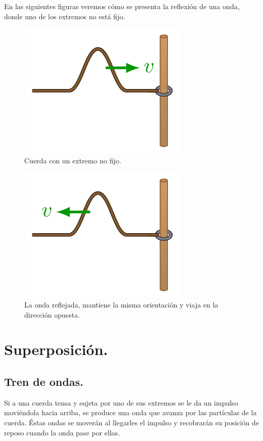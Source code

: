 \documentclass[12pt, letter]{article}
\begin{document}
En las siguientes figuras veremos cómo se presenta la reflexión de una onda, donde uno de los extremos no está fijo.
\begin{figure}[H]
    \centering
    \includegraphics[scale=0.7]{Imagenes/Reflexion_Ondas_03.png}
    \caption{Cuerda con un extremo no fijo.}
\end{figure}
\begin{figure}[H]
    \centering
    \includegraphics[scale=0.7]{Imagenes/Reflexion_Ondas_04.png}
    \caption{La onda reflejada, mantiene la misma orientación y viaja en la dirección opuesta.}
\end{figure}


\section{Superposición.}

\subsection{Tren de ondas.}

Si a una cuerda tensa y sujeta por uno de sus extremos se le da un impulso moviéndola hacia arriba, se produce una onda que avanza por las partículas de la cuerda. Éstas ondas se moverán al llegarles el impulso y recobrarán su posición de reposo cuando la onda pase por ellas.
\end{document}
